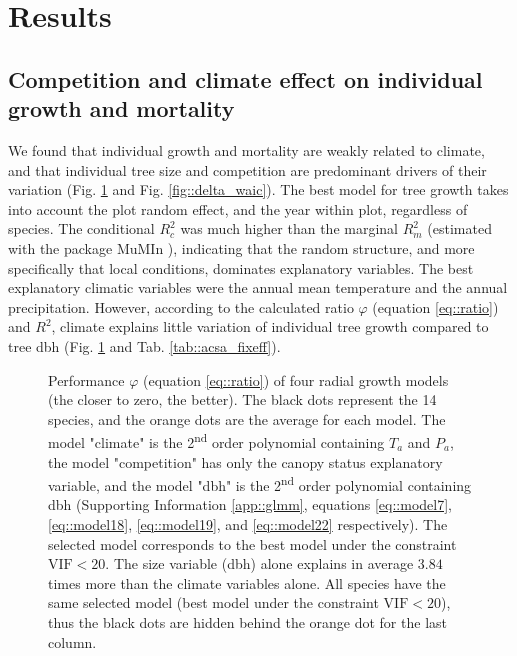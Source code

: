 \section{Results}

\subsection{Competition and climate effect on individual growth and mortality}

We found that individual growth and mortality are weakly related to climate, and that individual tree size and competition are predominant drivers of their variation (Fig. \ref{fig::delta_aic} and Fig. \ref{fig::delta_waic}). The best model for tree growth takes into account the plot random effect, and the year within plot, regardless of species. The conditional $ R_c^2 $ was much higher than the marginal $ R_m^2 $ (estimated with the package MuMIn \citep{MuMIn}), indicating that the random structure, and more specifically that local conditions, dominates explanatory variables. The best explanatory climatic variables were the annual mean temperature and the annual precipitation. However, according to the calculated ratio $ \varphi $ (equation \ref{eq::ratio}) and $ R^2 $, climate explains little variation of individual tree growth compared to tree dbh (Fig. \ref{fig::delta_aic} and Tab. \ref{tab::acsa_fixeff}).

\begin{figure}
	\centering
	
	\caption{Performance $ \varphi $ (equation \ref{eq::ratio}) of four radial growth models (the closer to zero, the better). The black dots represent the 14 species, and the orange dots are the average for each model. The model "climate" is the 2\textsuperscript{nd} order polynomial containing $ T_a $ and $ P_a $, the model "competition" has only the canopy status explanatory variable, and the model "dbh" is the 2\textsuperscript{nd} order polynomial containing dbh (Supporting Information \ref{app::glmm}, equations \eqref{eq::model7}, \eqref{eq::model18}, \eqref{eq::model19}, and \eqref{eq::model22} respectively). The selected model corresponds to the best model under the constraint $ \text{VIF} < 20 $. The size variable (dbh) alone explains in average $ 3.84 $ times more than the climate variables alone. All species have the same selected model (\ie best model under the constraint $ \text{VIF} < 20 $), thus the black dots are hidden behind the orange dot for the last column. \label{fig::delta_aic}}
\end{figure}

